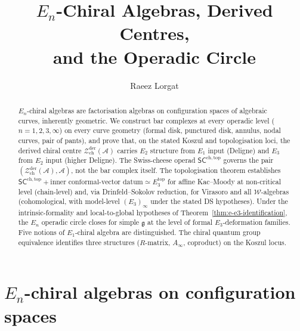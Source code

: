 \documentclass[11pt,reqno]{amsart}
\theoremstyle{definition}
\theoremstyle{remark}
\providecommand{\cA}{\mathcal{A}}
\providecommand{\cW}{\mathcal{W}}
\providecommand{\cZ}{\mathcal{Z}}
\providecommand{\fg}{\mathfrak{g}}
\providecommand{\Ainf}{A_\infty}
\providecommand{\Eone}{E_1}
\providecommand{\Etwo}{E_2}
\providecommand{\Ethree}{E_3}
\providecommand{\En}{E_n}
\providecommand{\SCchtop}{\ensuremath{\mathsf{SC}^{\mathrm{ch,top}}}}
\begin{document}
\title[$\En$-Chiral Algebras and the Operadic Circle]
{$\En$-Chiral Algebras, Derived Centres,\\
and the Operadic Circle}

\author{Raeez Lorgat}
\address{Perimeter Institute for Theoretical Physics,
 Waterloo, ON N2L 2Y5, Canada}

\date{}

\begin{abstract}
$\En$-chiral algebras are factorisation algebras on configuration
spaces of algebraic curves, inherently geometric. We construct bar
complexes at every operadic level ($n = 1, 2, 3, \infty$) on every
curve geometry (formal disk, punctured disk, annulus, nodal curves,
pair of pants), and prove that, on the stated Koszul and
topologisation loci, the derived chiral centre
$\cZ^{\mathrm{der}}_{\mathrm{ch}}(\cA)$ carries $\Etwo$ structure from
$\Eone$ input (Deligne) and $\Ethree$ from $\Etwo$ input (higher Deligne).
The Swiss-cheese operad $\SCchtop$ governs the pair
$(\cZ^{\mathrm{der}}_{\mathrm{ch}}(\cA), \cA)$, not the bar complex
itself. The topologisation theorem establishes
$\SCchtop + \text{inner conformal-vector datum} \simeq \Ethree^{\mathrm{top}}$ for
affine Kac--Moody at non-critical level (chain-level) and, via
Drinfeld--Sokolov reduction, for Virasoro and all $\cW$-algebras
(cohomological, with model-level $(\Ethree)_\infty$ under the stated
DS hypotheses). Under the intrinsic-formality and local-to-global
hypotheses of Theorem~\ref{thm:e-e3-identification}, the $\En$
operadic circle closes for simple $\fg$ at the level of formal
\(\Ethree\)-deformation families. Five notions of
$\Eone$-chiral algebra are distinguished. The chiral quantum group
equivalence identifies three structures ($R$-matrix, $\Ainf$,
coproduct) on the Koszul locus.
\end{abstract}

\maketitle
\tableofcontents


\section{$\En$-chiral algebras on configuration spaces}
\label{sec:en-chiral}
\end{document}
